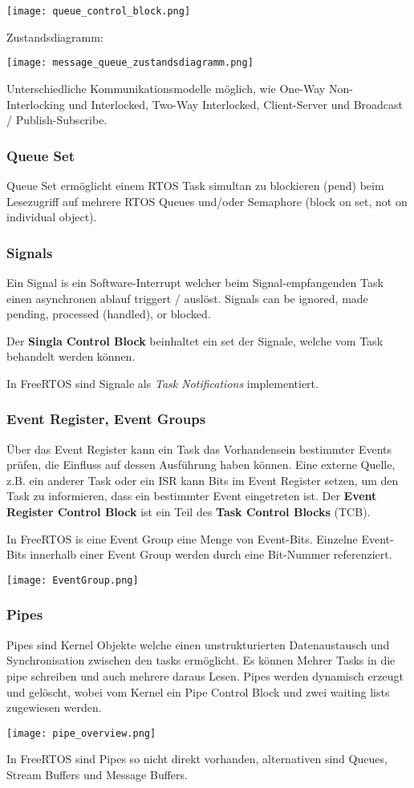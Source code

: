 \texttt{[image: queue\_control\_block.png]}

Zustandsdiagramm:

\texttt{[image: message\_queue\_zustandsdiagramm.png]}

Unterschiedliche Kommunikationsmodelle möglich, wie One-Way Non-Interlocking und Interlocked, Two-Way Interlocked, Client-Server und Broadcast / Publish-Subscribe.


\subsubsection{Queue Set}

Queue Set ermöglicht einem RTOS Task simultan zu blockieren (pend) beim Lesezugriff auf
mehrere RTOS Queues und/oder Semaphore (block on set, not on individual object).


\subsubsection{Signals}

Ein Signal is ein Software-Interrupt welcher beim Signal-empfangenden Task einen asynchronen ablauf triggert / auslöst.
Signals can be ignored, made pending, processed (handled), or blocked.

Der \textbf{Singla Control Block} beinhaltet ein set der Signale, welche vom Task behandelt werden können.

In FreeRTOS sind Signale als \textit{Task Notifications} implementiert.


\subsubsection{Event Register, Event Groups}

Über das Event Register kann ein Task das Vorhandensein bestimmter Events prüfen,
die Einfluss auf dessen Ausführung haben können.
Eine externe Quelle, z.B. ein anderer Task oder ein ISR kann Bits im Event Register setzen,
um den Task zu informieren, dass ein bestimmter Event eingetreten ist.
Der \textbf{Event Register Control Block} ist ein Teil des \textbf{Task Control Blocks} (TCB).

In FreeRTOS is eine Event Group eine Menge von Event-Bits.
Einzelne Event-Bits innerhalb einer Event Group werden durch eine Bit-Nummer referenziert.

\texttt{[image: EventGroup.png]}

\subsubsection{Pipes}

Pipes sind Kernel Objekte welche einen unstrukturierten Datenaustausch und Synchronisation zwischen den tasks ermöglicht.
Es können Mehrer Tasks in die pipe schreiben und auch mehrere daraus Lesen.
Pipes werden dynamisch erzeugt und gelöscht, wobei vom Kernel ein Pipe Control Block und zwei waiting lists zugewiesen werden.

\texttt{[image: pipe\_overview.png]}

In FreeRTOS sind Pipes so nicht direkt vorhanden, alternativen sind Queues, Stream Buffers und Message Buffers.